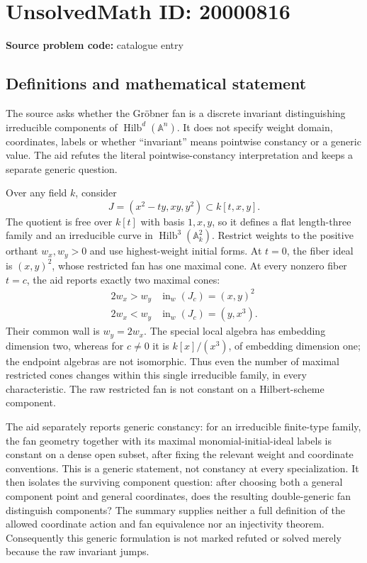 \documentclass[11pt]{article}
\newcommand{\A}{\mathbb{A}}
\begin{document}
\section*{UnsolvedMath ID: 20000816}
\textbf{Source problem code:} catalogue entry
\subsection{Definitions and mathematical statement}
The source asks whether the Gr\"obner fan is a discrete invariant distinguishing irreducible components of $\operatorname{Hilb}^d(\A^n)$. It does not specify weight domain, coordinates, labels or whether ``invariant'' means pointwise constancy or a generic value. The aid refutes the literal pointwise-constancy interpretation and keeps a separate generic question.

Over any field $k$, consider
\[
 J=(x^2-ty,xy,y^2)\subset k[t,x,y].
\]
The quotient is free over $k[t]$ with basis $1,x,y$, so it defines a flat length-three family and an irreducible curve in $\operatorname{Hilb}^3(\A^2_k)$. Restrict weights to the positive orthant $w_x,w_y>0$ and use highest-weight initial forms. At $t=0$, the fiber ideal is $(x,y)^2$, whose restricted fan has one maximal cone. At every nonzero fiber $t=c$, the aid reports exactly two maximal cones:
\[
 \begin{array}{c|c}
 2w_x>w_y&\operatorname{in}_w(J_c)=(x,y)^2\\
 2w_x<w_y&\operatorname{in}_w(J_c)=(y,x^3).
 \end{array}
\]
Their common wall is $w_y=2w_x$. The special local algebra has embedding dimension two, whereas for $c\neq0$ it is $k[x]/(x^3)$, of embedding dimension one; the endpoint algebras are not isomorphic. Thus even the number of maximal restricted cones changes within this single irreducible family, in every characteristic. The raw restricted fan is not constant on a Hilbert-scheme component.

The aid separately reports generic constancy: for an irreducible finite-type family, the fan geometry together with its maximal monomial-initial-ideal labels is constant on a dense open subset, after fixing the relevant weight and coordinate conventions. This is a generic statement, not constancy at every specialization. It then isolates the surviving component question: after choosing both a general component point and general coordinates, does the resulting double-generic fan distinguish components? The summary supplies neither a full definition of the allowed coordinate action and fan equivalence nor an injectivity theorem. Consequently this generic formulation is not marked refuted or solved merely because the raw invariant jumps.
\end{document}
